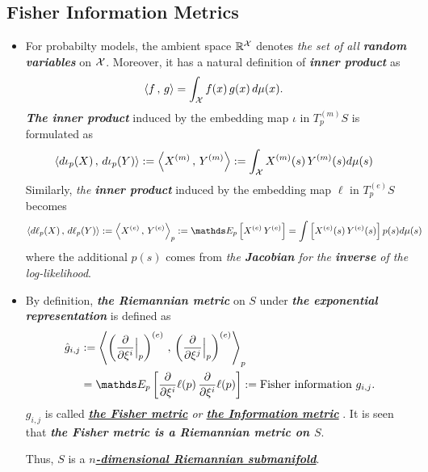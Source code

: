 \documentclass[11pt]{article}
\begin{document}
\subsection{Fisher Information Metrics}
\begin{itemize}
\item \begin{remark}
For probabilty models, the ambient space ${\mathbb R}^{{\mathcal X}}$ denotes \emph{the set of all \textbf{random variables}} on ${\mathcal X}$. Moreover, it has a natural definition of \emph{\textbf{inner product}} as 
\begin{align*}
\left\langle f\,,\, g \right\rangle &= \int_{{\mathcal X}} f(x)\,g(x)\, d\mu(x). 
\end{align*}  \emph{\textbf{The inner product}} induced by the embedding map $\iota$ in $T^{(m)}_pS$ is formulated as 
\begin{align}
\left\langle d\iota_p(X)\,,\, d\iota_{p}(Y) \right\rangle := \left\langle X^{(m)}\,,\, Y^{(m)} \right\rangle &:=  \int_{{\mathcal X}} X^{(m)}(s)\,Y^{(m)}(s) d\mu(s) \label{eqn: inner_product_mix}
\end{align}
Similarly,  \emph{the \textbf{inner product}} induced by the embedding map $\ell$ in $T^{(e)}_pS$ becomes
\begin{align}
\inn{d\ell_p(X)}{d\ell_{p}(Y)} := \inn{X^{(e)}}{Y^{(e)}}_{p} &:= \E{p}{X^{(e)}\,Y^{(e)}}=  \int \brac{X^{(e)}(s)\,Y^{(e)}(s)} p(s) d\mu(s)  \label{eqn: inner_product_exp}
\end{align} where the additional $p(s)$ comes from \emph{the \textbf{Jacobian} for the \textbf{inverse} of the log-likelihood}.
\end{remark}

\item By definition, \emph{\textbf{the Riemannian metric}} on $S$ under \emph{\textbf{the exponential representation}} is defined as 
\begin{align*}
\hat{g}_{i,j} &:= \inn{\paren{\partdiff{}{\xi^i}\Bigr|_{p}}^{(e)}}{\paren{\partdiff{}{\xi^j}\Bigr|_{p}}^{(e)}}_{p} \\
&= \E{p}{ \partdiff{}{\xi^i}\ell(p)\, \partdiff{}{\xi^i}\ell(p)} := \text{Fisher information }g_{i,j} .
\end{align*}  $g_{i,j}$ is called \emph{\underline{\textbf{the Fisher metric}} or \underline{\textbf{the Information metric}}} \citep{amari2007methods}. It is seen that  \emph{\textbf{the Fisher metric is a Riemannian metric on $S$}}. 

Thus, $S$ is a \underline{\emph{\textbf{$n$-dimensional Riemannian submanifold}}}.
\end{itemize}
\end{document}
